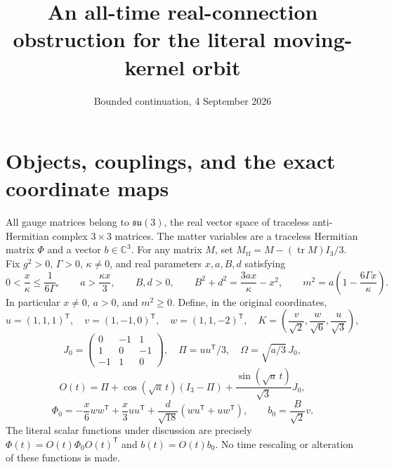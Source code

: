 \documentclass[11pt]{article}
\title{An all-time real-connection obstruction for the literal moving-kernel orbit}
\author{Bounded continuation, 4 September 2026}
\date{}
\newcommand{\tf}{\mathrm{tf}}
\newcommand{\su}{\mathfrak{su}}
\newcommand{\tr}{\operatorname{tr}}
\begin{document}
\maketitle

\section{Objects, couplings, and the exact coordinate maps}

All gauge matrices belong to $\su(3)$, the real vector space of traceless
anti-Hermitian complex $3\times3$ matrices. The matter variables are a
traceless Hermitian matrix $\Phi$ and a vector $b\in\mathbb C^3$.
For any matrix $M$, set $M_{\tf}=M-(\tr M)I_3/3$.
Fix $g^2>0$, $\Gamma>0$, $\kappa\ne0$, and real parameters
$x,a,B,d$ satisfying
\[
 0<\frac{x}{\kappa}\leq\frac{1}{6\Gamma},\qquad
 a>\frac{\kappa x}{3},\qquad B,d>0,\qquad
 B^2+d^2=\frac{3ax}{\kappa}-x^2,
 \qquad m^2=a\left(1-\frac{6\Gamma x}{\kappa}\right).
\]
In particular $x\ne0$, $a>0$, and $m^2\geq0$. Define, in the original
coordinates,
\[
 u=(1,1,1)^{\mathsf T},\quad v=(1,-1,0)^{\mathsf T},\quad
 w=(1,1,-2)^{\mathsf T},\quad
 K=\left(\frac{v}{\sqrt2},\frac{w}{\sqrt6},\frac{u}{\sqrt3}\right),
\]
\[
 J_0=\begin{pmatrix}0&-1&1\\1&0&-1\\-1&1&0\end{pmatrix},\quad
 \Pi=uu^{\mathsf T}/3,\quad \Omega=\sqrt{a/3}\,J_0,
\]
\[
 O(t)=\Pi+\cos(\sqrt a\,t)(I_3-\Pi)
             +\frac{\sin(\sqrt a\,t)}{\sqrt3}J_0,
\]
\[
 \Phi_0=-\frac{x}{6}ww^{\mathsf T}+\frac{x}{3}uu^{\mathsf T}
       +\frac{d}{\sqrt{18}}(wu^{\mathsf T}+uw^{\mathsf T}),
 \qquad b_0=\frac{B}{\sqrt2}v.
\]
The literal scalar functions under discussion are precisely
$\Phi(t)=O(t)\Phi_0O(t)^{\mathsf T}$ and $b(t)=O(t)b_0$.
No time rescaling or alteration of these functions is made.
\end{document}
